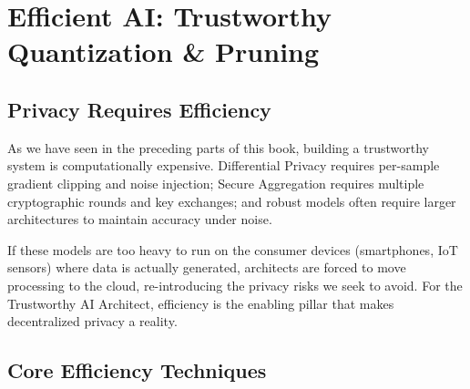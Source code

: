 
\chapter{Efficient AI: Trustworthy Quantization \& Pruning}
\label{chap:efficient_ai}


\section{Privacy Requires Efficiency}
\label{sec:privacy_efficiency}

As we have seen in the preceding parts of this book, building a trustworthy system is computationally expensive. Differential Privacy requires per-sample gradient clipping and noise injection; Secure Aggregation requires multiple cryptographic rounds and key exchanges; and robust models often require larger architectures to maintain accuracy under noise.

If these models are too heavy to run on the consumer devices (smartphones, IoT sensors) where data is actually generated, architects are forced to move processing to the cloud, re-introducing the privacy risks we seek to avoid. For the Trustworthy AI Architect, efficiency is the enabling pillar that makes decentralized privacy a reality.

\section{Core Efficiency Techniques}
\label{sec:efficiency_techniques}


